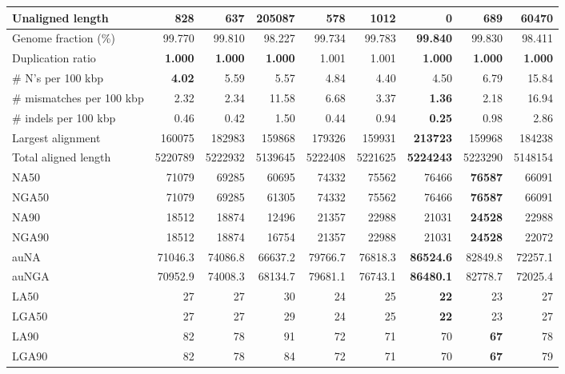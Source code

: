 \documentclass[12pt,a4paper]{article}
\begin{document}
\begin{table}[ht]
\begin{center}
\begin{tabular}{|l*{8}{|r}|}
Unaligned length & 828 & 637 & 205087 & 578 & 1012 & {\bf 0} & 689 & 60470 \\ \hline
Genome fraction (\%) & 99.770 & 99.810 & 98.227 & 99.734 & 99.783 & {\bf 99.840} & 99.830 & 98.411 \\ \hline
Duplication ratio & {\bf 1.000} & {\bf 1.000} & {\bf 1.000} & 1.001 & 1.001 & {\bf 1.000} & {\bf 1.000} & {\bf 1.000} \\ \hline
\# N's per 100 kbp & {\bf 4.02} & 5.59 & 5.57 & 4.84 & 4.40 & 4.50 & 6.79 & 15.84 \\ \hline
\# mismatches per 100 kbp & 2.32 & 2.34 & 11.58 & 6.68 & 3.37 & {\bf 1.36} & 2.18 & 16.94 \\ \hline
\# indels per 100 kbp & 0.46 & 0.42 & 1.50 & 0.44 & 0.94 & {\bf 0.25} & 0.98 & 2.86 \\ \hline
Largest alignment & 160075 & 182983 & 159868 & 179326 & 159931 & {\bf 213723} & 159968 & 184238 \\ \hline
Total aligned length & 5220789 & 5222932 & 5139645 & 5222408 & 5221625 & {\bf 5224243} & 5223290 & 5148154 \\ \hline
NA50 & 71079 & 69285 & 60695 & 74332 & 75562 & 76466 & {\bf 76587} & 66091 \\ \hline
NGA50 & 71079 & 69285 & 61305 & 74332 & 75562 & 76466 & {\bf 76587} & 66091 \\ \hline
NA90 & 18512 & 18874 & 12496 & 21357 & 22988 & 21031 & {\bf 24528} & 22988 \\ \hline
NGA90 & 18512 & 18874 & 16754 & 21357 & 22988 & 21031 & {\bf 24528} & 22072 \\ \hline
auNA & 71046.3 & 74086.8 & 66637.2 & 79766.7 & 76818.3 & {\bf 86524.6} & 82849.8 & 72257.1 \\ \hline
auNGA & 70952.9 & 74008.3 & 68134.7 & 79681.1 & 76743.1 & {\bf 86480.1} & 82778.7 & 72025.4 \\ \hline
LA50 & 27 & 27 & 30 & 24 & 25 & {\bf 22} & 23 & 27 \\ \hline
LGA50 & 27 & 27 & 29 & 24 & 25 & {\bf 22} & 23 & 27 \\ \hline
LA90 & 82 & 78 & 91 & 72 & 71 & 70 & {\bf 67} & 78 \\ \hline
LGA90 & 82 & 78 & 84 & 72 & 71 & 70 & {\bf 67} & 79 \\ \hline
\end{tabular}
\end{center}
\end{table}
\end{document}
